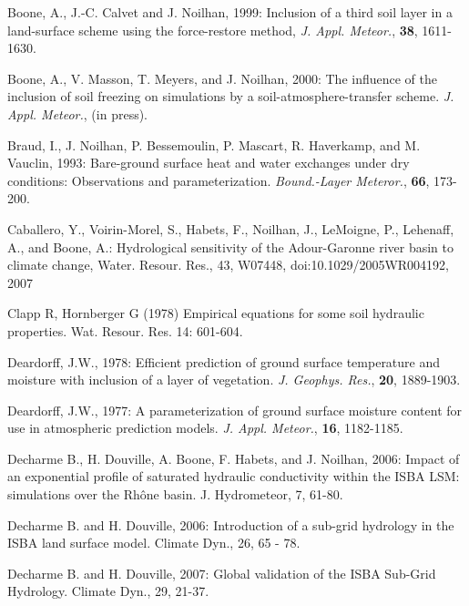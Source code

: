 \begin{description}
\item
Boone, A.,
J.-C. Calvet and J. Noilhan, 1999:
Inclusion of a third soil layer in a
land-surface scheme using the force-restore method,
{\em J. Appl. Meteor.},
{\bf 38},
1611-1630.

\item
Boone, A.,
V. Masson, T. Meyers, and J. Noilhan, 2000:
The influence of the inclusion of soil freezing
on simulations by a soil-atmosphere-transfer scheme.
{\em J. Appl. Meteor.},
(in press).

\item
Braud, I., J. Noilhan, P. Bessemoulin, P. Mascart, R. Haverkamp,
and M. Vauclin, 1993:
Bare-ground surface heat and water exchanges under dry conditions:
Observations and parameterization.
{\em Bound.-Layer Meteror.},
{\bf 66},
173-200.

\item
Caballero, Y., Voirin-Morel, S., Habets, F., Noilhan, J., LeMoigne, P., Lehenaff, A., and Boone,
A.: Hydrological sensitivity of the Adour-Garonne river basin to climate change, Water. Resour. Res., 43, W07448, doi:10.1029/2005WR004192, 2007

\item
Clapp R, Hornberger G (1978) Empirical equations for some soil hydraulic properties. Wat. 
Resour. Res. 14: 601-604.

\item
Deardorff, J.W., 1978:
Efficient prediction of ground surface temperature and moisture
with inclusion of a layer of vegetation.
{\em J. Geophys. Res.},
{\bf 20},
1889-1903.

\item
Deardorff, J.W., 1977:
A parameterization of ground surface moisture content for
use in atmospheric prediction models.
{\em J. Appl. Meteor.},
{\bf 16},
1182-1185.

\item
Decharme B., H. Douville, A. Boone, F. Habets, and J. Noilhan, 2006: Impact of an 
exponential profile of saturated hydraulic conductivity within the ISBA LSM: simulations 
over the Rhône basin. J. Hydrometeor, 7, 61-80.

\item
Decharme B. and H. Douville, 2006: Introduction of a sub-grid hydrology in the ISBA land 
surface model. Climate Dyn., 26, 65 - 78.

\item
Decharme B. and H. Douville, 2007: Global validation of the ISBA Sub-Grid Hydrology. 
Climate Dyn., 29, 21-37.


\end{description}
